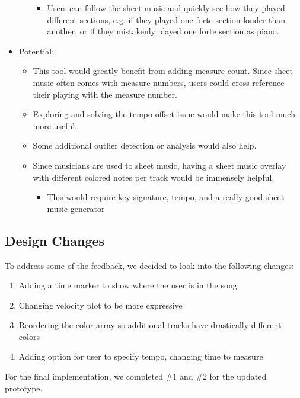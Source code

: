 \documentclass[journal]{vgtc}                %
\begin{document}
\begin{itemize}
\begin{itemize}
    \begin{itemize}
      \item Users can follow the sheet music and quickly see how they played
      different sections, e.g. if they played one forte section louder than
      another, or if they mistakenly played one forte section as piano.
    \end{itemize}
  \end{itemize}
  \item Potential:
  \begin{itemize}
    \item This tool would greatly benefit from adding measure count. Since sheet
    music often comes with measure numbers, users could cross-reference their
    playing with the measure number.
    \item Exploring and solving the tempo offset issue would make this tool much
    more useful.
    \item Some additional outlier detection or analysis would also help.
    \item Since musicians are used to sheet music, having a sheet music overlay
    with different colored notes per track would be immensely helpful.
    \begin{itemize}
      \item This would require key signature, tempo, and a really good sheet music generator
    \end{itemize}
  \end{itemize}
\end{itemize}

\subsection{Design Changes}

To address some of the feedback, we decided to look into the
following changes:

\begin{enumerate}
  \item Adding a time marker to show where the user is in the song
  \item Changing velocity plot to be more expressive
  \item Reordering the color array so additional tracks have drastically different colors
  \item Adding option for user to specify tempo, changing time to measure
\end{enumerate}

For the final implementation, we completed \#1 and \#2 for the updated prototype.
\end{document}
